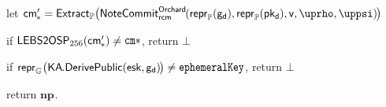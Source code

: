 \documentclass{article}
\let\oldmathtt\mathtt
\renewcommand{\mathtt}[1]{\scalebox{0.97}[1.07]{$\oldmathtt{#1}$}}
\theoremstyle{labelledtheorem} %
\newcommand{\tab}{\hspace{1.8em}}
\newcommand{\Of}[1]{\!\left({#1}\right)\!}
\newcommand{\EphemeralPrivate}{\mathsf{esk}}
\newcommand{\DiversifiedTransmitBase}{\mathsf{g_d}}
\newcommand{\DiversifiedTransmitPublic}{\mathsf{pk_d}}
\newcommand{\NoteCommitAlg}[1]{\mathsf{NoteCommit}^\mathsf{#1\kern-0.1em}}
\newcommand{\NoteCommit}[2]{\NoteCommitAlg{#1}_{\vphantom{l}#2}}
\newcommand{\KA}[1]{\mathsf{KA}^\mathsf{#1\kern-0.1em}}
\newcommand{\KADerivePublic}[1]{\KA{#1}\mathsf{.DerivePublic}}
\newcommand{\Value}{\mathsf{v}}
\newcommand{\NotePlaintext}[1]{\mathbf{np}_{#1}}
\newcommand{\NoteCommitRand}{\mathsf{rcm}}
\newcommand{\NoteUniqueRand}{\mathsf{\uprho}}
\newcommand{\NoteNullifierRand}{\mathsf{\uppsi}}
\newcommand{\cm}{\mathsf{cm}}
\newcommand{\cmstar}{\cm_{\kern -0.06em \ast}}
\newcommand{\cmstarField}{\mathtt{cm*}}
\newcommand{\ephemeralKey}{\mathtt{ephemeralKey}}
\newcommand{\Extract}{\mathsf{Extract}}
\newcommand{\GroupG}[1]{\mathbb{G}_{#1}}
\newcommand{\reprG}[1]{\repr_{\GroupG{#1}}}
\newcommand{\GroupP}{\mathbb{P}}
\newcommand{\reprP}{\repr_{\GroupP}}
\newcommand{\ExtractP}{\Extract_{\GroupP}}
\newcommand{\repr}{\mathsf{repr}}
\newcommand{\LEBStoOSP}[1]{\mathsf{LEBS2OSP}_{#1}}
\newcommand{\LEBStoOSPOf}[2]{\LEBStoOSP{#1}\!\left({#2}\right)}
\begin{document}
{\begin{algorithm}
{  \item \tab let $\cmstar' = \ExtractP\big(\NoteCommit{Orchard}{\NoteCommitRand}(\reprP\Of{\DiversifiedTransmitBase},
                                                                                 \reprP\Of{\DiversifiedTransmitPublic},
                                                                                 \Value,
                                                                                 \NoteUniqueRand,
                                                                                 \NoteNullifierRand)\kern-0.1em\big)$
  \item \vspace{-3.5ex}
} %
  \item if $\LEBStoOSPOf{256}{\cmstar'} \neq \cmstarField$, return $\bot$
        \vspace{-1ex}
  \item if $\reprG{}\big(\KADerivePublic{}(\EphemeralPrivate, \DiversifiedTransmitBase)\kern-0.12em\big) \neq \ephemeralKey$,
        return $\bot$
        \vspace{-0.4ex}
  \item return $\NotePlaintext{}$.
\end{algorithm}

}
\end{document}
